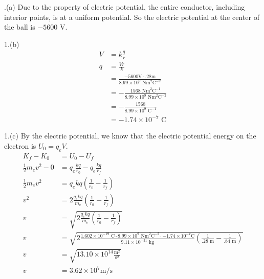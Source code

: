 \documentclass[11pt]{article}
\begin{document}
.(a) 
Due to the property of electric potential, the entire conductor, including interior points, is at a uniform potential.
So the electric potential at the center of the ball is \(-5600 \text{ V}\).

1.(b)
\begin{align*}
V &= k \frac{q}{r} \\
q &= \frac{Vr}{k} \\
  &= \frac{-5600 \text{V} \cdot .28\text{m}}{8.99 \times 10^9 \text{ Nm}^2\text{C}^{-2}} \\
  &= - \frac{1568 \text{ Nm}^2\text{C}^{-1}}{8.99 \times 10^9 \text{ Nm}^2\text{C}^{-2}} \\
  &= - \frac{1568}{8.99 \times 10^9 \text{ C}^{-1}} \\
  &= - 1.74 \times 10^{-7} \text{ C}
\end{align*}

1.(c)
By the electric potential, we know that the electric potential energy on the electron is \(U_0 = q_eV\). 
\begin{align*}
K_f - K_0 &= U_0 - U_f \\
\frac{1}{2}m_e v^{2} - 0 &= q_e \frac{kq}{r_0} - q_e \frac{kq}{r_f} \\
\frac{1}{2}m_e v^{2} &= q_e kq ( \frac{1}{r_0} - \frac{1}{r_f} ) \\
v^{2} &= 2 \frac{q_e kq}{m_e} ( \frac{1}{r_0} - \frac{1}{r_f}) \\
v &= \sqrt{2 \frac{q_e kq}{m_e} ( \frac{1}{r_0} - \frac{1}{r_f} )} \\
v &= \sqrt{2 \frac{1.602 \times 10^{-19} \text{ C} \cdot 8.99 \times 10^9 \text{ Nm}^2\text{C}^{-2} \cdot - 1.74 \times 10^{-7} \text{C}}{9.11 \times 10^{-31} \text{ kg}} ( \frac{1}{.28 \text{ m}} - \frac{1}{.84 \text{ m}} )} \\
v &= \sqrt{13.10 \times 10^{14} \frac{\text{m}^2}{\text{s}^2}} \\
v &= 3.62 \times 10^{7} \text{m} / \text{s}
\end{align*}
\end{document}
